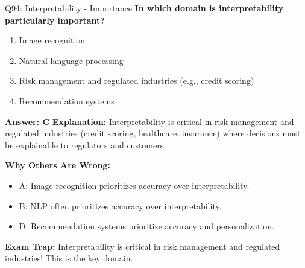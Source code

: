 \documentclass[8pt]{beamer}
\begin{document}
	\begin{frame}{Q94: Interpretability - Importance}
		\fontsize{6.5}{7.5}\selectfont
		\textbf{In which domain is interpretability particularly important?}
		
		\begin{enumerate}
			\item Image recognition
			\item Natural language processing
			\item Risk management and regulated industries (e.g., credit scoring)
			\item Recommendation systems
		\end{enumerate}
		
		\vspace{0.05cm}
		\textcolor{myblue}{\textbf{Answer: C}}
		\vspace{0.05cm}
		\textcolor{myblue}{\textbf{Explanation:}} Interpretability is critical in risk management and regulated industries (credit scoring, healthcare, insurance) where decisions must be explainable to regulators and customers.
		
		\vspace{0.05cm}
		\textcolor{myred}{\textbf{Why Others Are Wrong:}}
		\begin{itemize}
			\item \textcolor{myred}{A:} Image recognition prioritizes accuracy over interpretability.
			\item \textcolor{myred}{B:} NLP often prioritizes accuracy over interpretability.
			\item \textcolor{myred}{D:} Recommendation systems prioritize accuracy and personalization.
		\end{itemize}
		
		\textcolor{myred}{\textbf{Exam Trap:}} Interpretability is critical in \textcolor{myblue}{risk management and regulated industries}! This is the key domain.
	\end{frame}
	
\end{document}
